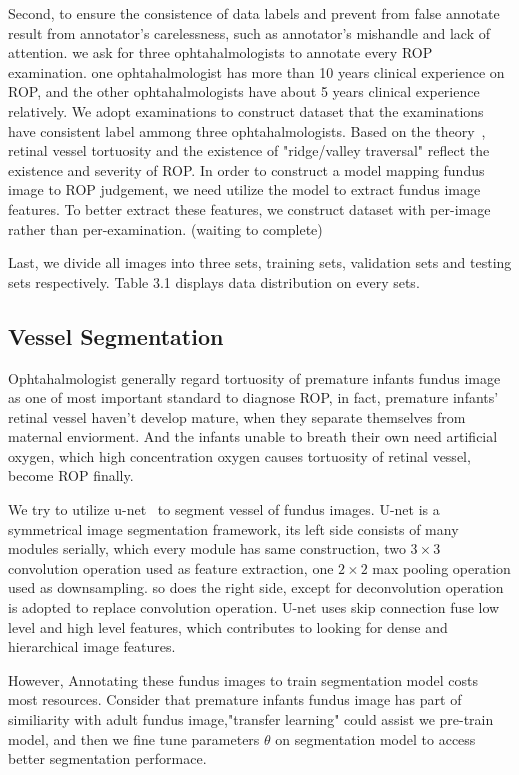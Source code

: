 \documentclass[10pt,twocolumn,letterpaper]{article}
\begin{document}
  Second, to ensure the consistence of data labels and prevent from false annotate result from annotator's carelessness, such as annotator's mishandle and lack of attention. we ask for three ophtahalmologists to annotate every ROP examination. one ophtahalmologist has more than 10 years clinical experience on ROP, and the other ophtahalmologists have about 5 years clinical experience relatively. We adopt examinations to construct dataset that the examinations have consistent label ammong three ophtahalmologists. Based on the theory~\cite{Alpher01}, retinal vessel tortuosity and the existence of "ridge/valley traversal" reflect the existence and severity of ROP. In order to construct a model mapping fundus image to ROP judgement, we need utilize the model to extract fundus image features. To better extract these features, we construct dataset with per-image rather than per-examination. (waiting to complete)

  Last, we divide all images into three sets, training sets, validation sets and testing sets respectively. Table 3.1 displays data distribution on every sets.

\subsection{Vessel Segmentation}
  Ophtahalmologist generally regard tortuosity of premature infants fundus image as one of most important standard to diagnose ROP, in fact, premature infants' retinal vessel haven't develop mature, when they separate themselves from maternal enviorment. And the infants unable to breath their own need artificial oxygen, which high concentration oxygen causes tortuosity of retinal vessel, become ROP finally.

  We try to utilize u-net~\cite{02} to segment vessel of fundus images. U-net is a symmetrical image segmentation framework, its left side consists of many modules serially, which every module has same construction, two $3\times3$ convolution operation used as feature extraction, one $2\times2$ max pooling operation used as downsampling. so does the right side, except for deconvolution operation is adopted to replace convolution operation. U-net uses skip connection fuse low level and high level features, which contributes to looking for dense and hierarchical image features.

  However, Annotating these fundus images to train segmentation model costs most resources.
  Consider that premature infants fundus image has part of similiarity with adult fundus image,"transfer learning" could assist we pre-train model, and then we fine tune parameters $\theta$ on segmentation model to access better segmentation performace.
\end{document}
